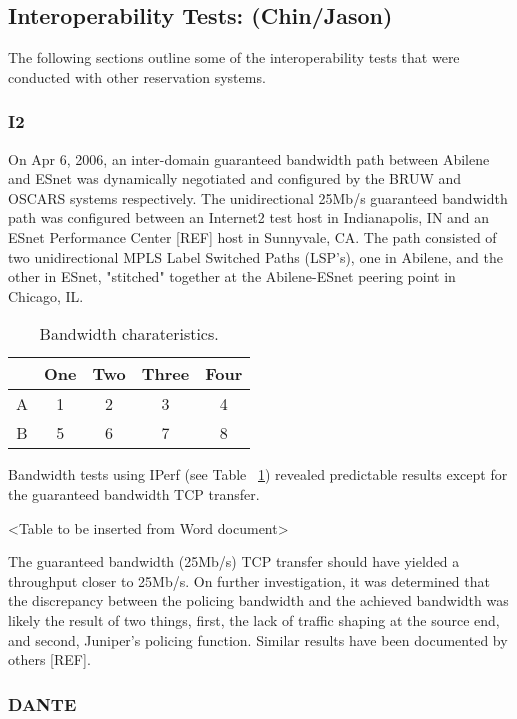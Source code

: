 \documentclass[conference]{IEEEtran}
\begin{document}
\subsection{Interoperability Tests:  (Chin/Jason)}

The following sections outline some of the interoperability tests that were 
conducted with other reservation systems.

\subsubsection{I2}
On Apr 6, 2006, an inter-domain guaranteed bandwidth path between Abilene and 
ESnet was dynamically negotiated and configured by the BRUW and OSCARS systems 
respectively. The unidirectional 25Mb/s guaranteed bandwidth path was 
configured between an Internet2 test host in Indianapolis, IN and an ESnet 
Performance Center [REF] host in Sunnyvale, CA.  The path consisted of two 
unidirectional MPLS Label Switched Paths (LSP's), one in Abilene, and the 
other in ESnet, "stitched" together at the Abilene-ESnet peering point in 
Chicago, IL.

\begin{table}
 \centering
 {\scriptsize
 \begin{tabular}{|c|c|c|c|c|}
 \hline
   & One & Two & Three & Four \\ \hline \hline
 A & 1   & 2   &   3   & 4    \\ \hline 
 B & 5   & 6   &   7   & 8    \\ \hline 
 \end{tabular}
 }
 \caption{Bandwidth charateristics.}
 \label{tab:bandwidth}
\end{table}

Bandwidth tests using IPerf (see Table ~\ref{tab:bandwidth}) revealed predictable results except for the guaranteed bandwidth TCP transfer.

<Table to be inserted from Word document>

The guaranteed bandwidth (25Mb/s) TCP transfer should have yielded a 
throughput closer to 25Mb/s.  On further investigation, it was determined 
that the 
discrepancy between the policing bandwidth and the achieved bandwidth was 
likely the result of two things, first, the lack of traffic shaping at the 
source end, and second, Juniper's policing function.  Similar results have 
been documented by others [REF].

\subsubsection{DANTE}
\end{document}

